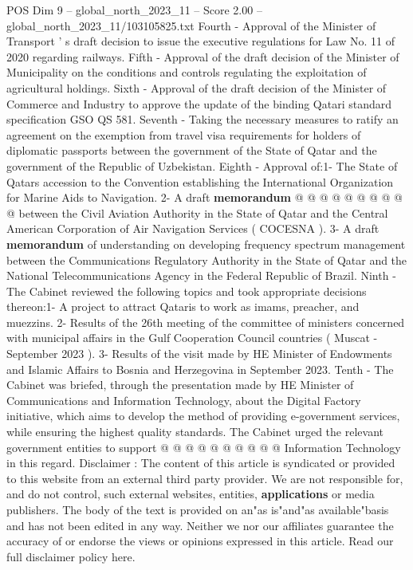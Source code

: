 \begin{textsample}{POS Dim 9 – global\_north\_2023\_11 – Score 2.00 – global\_north\_2023\_11/103105825.txt}
Fourth - Approval of the Minister of Transport ' s draft decision to issue the executive regulations for Law No. 11 of 2020 regarding railways.
Fifth - Approval of the draft decision of the Minister of Municipality on the conditions and controls regulating the exploitation of agricultural holdings.
Sixth - Approval of the draft decision of the Minister of Commerce and Industry to approve the update of the binding Qatari standard specification GSO QS 581.
Seventh - Taking the necessary measures to ratify an agreement on the exemption from travel visa requirements for holders of diplomatic passports between the government of the State of Qatar and the government of the Republic of Uzbekistan.
Eighth - Approval of:1- The State of Qatars accession to the Convention establishing the International Organization for Marine Aids to Navigation. 2- A draft \textbf{memorandum} @ @ @ @ @ @ @ @ @ @ between the Civil Aviation Authority in the State of Qatar and the Central American Corporation of Air Navigation Services ( COCESNA ). 3- A draft \textbf{memorandum} of understanding on developing frequency spectrum management between the Communications Regulatory Authority in the State of Qatar and the National Telecommunications Agency in the Federal Republic of Brazil.
Ninth - The Cabinet reviewed the following topics and took appropriate decisions thereon:1- A project to attract Qataris to work as imams, preacher, and muezzins. 2- Results of the 26th meeting of the committee of ministers concerned with municipal affairs in the Gulf Cooperation Council countries ( Muscat - September 2023 ). 3- Results of the visit made by HE Minister of Endowments and Islamic Affairs to Bosnia and Herzegovina in September 2023.
Tenth - The Cabinet was briefed, through the presentation made by HE Minister of Communications and Information Technology, about the Digital Factory initiative, which aims to develop the method of providing e-government services, while ensuring the highest quality standards.
The Cabinet urged the relevant government entities to support @ @ @ @ @ @ @ @ @ @ Information Technology in this regard.
Disclaimer : The content of this article is syndicated or provided to this website from an external third party provider.
We are not responsible for, and do not control, such external websites, entities, \textbf{applications} or media publishers.
The body of the text is provided on an"as is"and"as available"basis and has not been edited in any way.
Neither we nor our affiliates guarantee the accuracy of or endorse the views or opinions expressed in this article.
Read our full disclaimer policy here.

\end{textsample}
